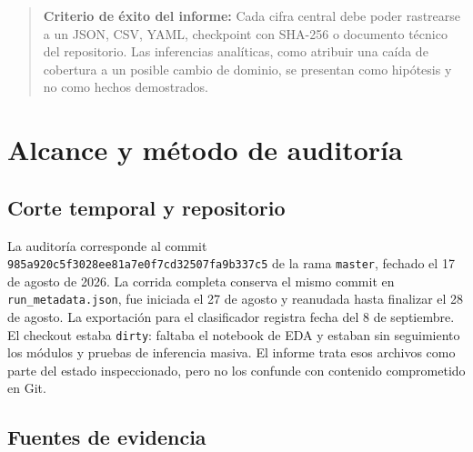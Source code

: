 \documentclass[11pt,a4paper]{article}
\begin{document}
\begin{quote}\textbf{Criterio de éxito del informe:} Cada cifra central debe poder rastrearse a un JSON, CSV, YAML, checkpoint con SHA-256 o documento técnico del repositorio. Las inferencias analíticas, como atribuir una caída de cobertura a un posible cambio de dominio, se presentan como hipótesis y no como hechos demostrados.\end{quote}

\section{Alcance y método de auditoría}

\subsection{Corte temporal y repositorio}

La auditoría corresponde al commit \texttt{985a920c5f3028ee81a7e0f7cd32507fa9b337c5} de la rama \texttt{master}, fechado el 17 de agosto de 2026. La corrida completa conserva el mismo commit en \texttt{run\_metadata.json}, fue iniciada el 27 de agosto y reanudada hasta finalizar el 28 de agosto. La exportación para el clasificador registra fecha del 8 de septiembre. El checkout estaba \texttt{dirty}: faltaba el notebook de EDA y estaban sin seguimiento los módulos y pruebas de inferencia masiva. El informe trata esos archivos como parte del estado inspeccionado, pero no los confunde con contenido comprometido en Git.


\subsection{Fuentes de evidencia}
\end{document}
